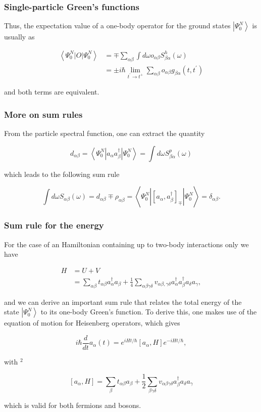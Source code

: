 \documentclass[compress]{beamer}
\begin{document}
\frame
{
\frametitle{Single-particle Green's functions}
\begin{small}
{\scriptsize
Thus, the expectation value of a one-body operator for the
ground states $\left|\Psi_{0}^{N}\right\rangle$ is usually as

$$
\begin{aligned}
\left\langle\Psi_{0}^{N}|O| \Psi_{0}^{N}\right\rangle & =\mp \sum_{\alpha \beta} \int d \omega o_{\alpha \beta} S_{\beta \alpha}^{h}(\omega) \\
& = \pm i \hbar \lim _{t^{\prime} \rightarrow t^{+}} \sum_{\alpha \beta} o_{\alpha \beta} g_{\beta \alpha}\left(t, t^{\prime}\right)
\end{aligned}
$$

and both terms are equivalent.

}
\end{small}
}


\frame
{
\frametitle{More on sum rules}
\begin{small}
{\scriptsize
From the particle spectral function, one can extract the quantity

$$
d_{\alpha \beta}=\left\langle\Psi_{0}^{N}\left|a_{\alpha} a_{\beta}^{\dagger}\right| \Psi_{0}^{N}\right\rangle=\int d \omega S_{\beta \alpha}^{p}(\omega)
$$

which leads to the following sum rule

$$
\int d \omega S_{\alpha \beta}(\omega)=d_{\alpha \beta} \mp \rho_{\alpha \beta}=\left\langle\Psi_{0}^{N}\left|\left[a_{\alpha}, a_{\beta}^{\dagger}\right]_{\mp}\right| \Psi_{0}^{N}\right\rangle=\delta_{\alpha \beta} .
$$

}
\end{small}
}
\frame
{
\frametitle{Sum rule for the energy}
\begin{small}
{\scriptsize
For the case of an Hamiltonian containing up to two-body interactions only we have

$$
\begin{aligned}
H & =U+V \\
& =\sum_{\alpha \beta} t_{\alpha \beta} a_{\alpha}^{\dagger} a_{\beta}+\frac{1}{4} \sum_{\alpha \beta \gamma \delta} v_{\alpha \beta, \gamma \delta} a_{\alpha}^{\dagger} a_{\beta}^{\dagger} a_{\delta} a_{\gamma},
\end{aligned}
$$

and we can derive an important sum rule that relates the total energy
of the state $\left|\Psi_{0}^{N}\right\rangle$ to its one-body Green's
function. To derive this, one makes use of the equation of motion for
Heisenberg operators, which gives

$$
i \hbar \frac{d}{d t} a_{\alpha}(t)=e^{i H t / \hbar}\left[a_{\alpha}, H\right] e^{-i H t / \hbar},
$$

with $^{2}$

$$
\left[a_{\alpha}, H\right]=\sum_{\beta} t_{\alpha \beta} a_{\beta}+\frac{1}{2} \sum_{\beta \gamma \delta} v_{\alpha \beta \gamma \delta} a_{\beta}^{\dagger} a_{\delta} a_{\gamma}
$$

which is valid for both fermions and bosons.

}
\end{small}
}
\end{document}
